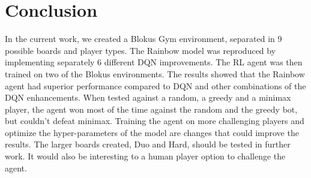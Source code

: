 \documentclass{article}
\begin{document}
\section{Conclusion}
In the current work, we created a Blokus Gym environment, separated in 9 possible boards and player types. The Rainbow model \cite{rainbow} was reproduced by implementing separately 6 different DQN improvements. The RL agent was then trained on two of the Blokus environments. The results showed that the Rainbow agent had superior performance compared to DQN and other combinations of the DQN enhancements. When tested against a random, a greedy and a minimax player, the agent won most of the time against the random and the greedy bot, but couldn't defeat minimax. Training the agent on more challenging players and optimize the hyper-parameters of the model are changes that could improve the results. The larger boards created, Duo and Hard, should be tested in further work. It would also be interesting to a human player option to challenge the agent.




\end{document}
